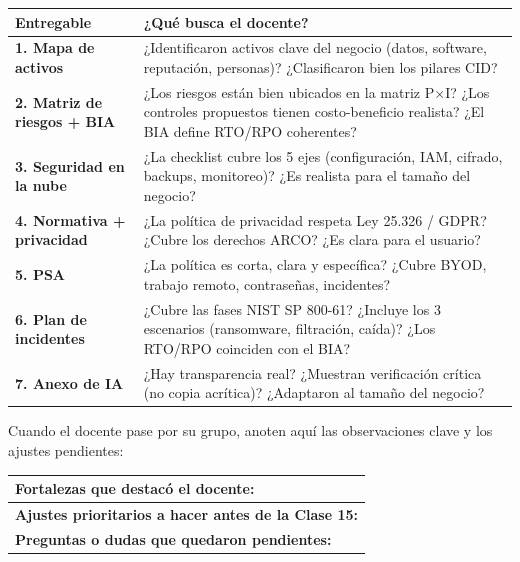 \documentclass[12pt,a4paper]{article}
\renewcommand{\arraystretch}{1.25}
\begin{document}
\vspace{6pt}
\renewcommand{\arraystretch}{1.5}
\begin{tabularx}{\textwidth}{|>{\bfseries\color{azulMentoring}}p{3.2cm}|X|}
\hline
\rowcolor{grisClaro}
\textbf{Entregable} & \textbf{¿Qu\'e busca el docente?} \\
\hline
1. Mapa de activos & ¿Identificaron activos clave del negocio (datos, software, reputaci\'on, personas)? ¿Clasificaron bien los pilares CID? \\
\hline
2. Matriz de riesgos + BIA & ¿Los riesgos est\'an bien ubicados en la matriz P$\times$I? ¿Los controles propuestos tienen costo-beneficio realista? ¿El BIA define RTO/RPO coherentes? \\
\hline
3. Seguridad en la nube & ¿La checklist cubre los 5 ejes (configuraci\'on, IAM, cifrado, backups, monitoreo)? ¿Es realista para el tama\~no del negocio? \\
\hline
4. Normativa + privacidad & ¿La pol\'itica de privacidad respeta Ley 25.326 / GDPR? ¿Cubre los derechos ARCO? ¿Es clara para el usuario? \\
\hline
5. PSA & ¿La pol\'itica es corta, clara y espec\'ifica? ¿Cubre BYOD, trabajo remoto, contrase\~nas, incidentes? \\
\hline
6. Plan de incidentes & ¿Cubre las fases NIST SP 800-61? ¿Incluye los 3 escenarios (ransomware, filtraci\'on, ca\'ida)? ¿Los RTO/RPO coinciden con el BIA? \\
\hline
7. Anexo de IA & ¿Hay transparencia real? ¿Muestran verificaci\'on cr\'itica (no copia acr\'itica)? ¿Adaptaron al tama\~no del negocio? \\
\hline
\end{tabularx}

\vspace{8pt}
\begin{cajaActividad}[title={Registro del feedback docente}]
Cuando el docente pase por su grupo, anoten aqu\'i las observaciones clave y los ajustes pendientes:
\end{cajaActividad}

\vspace{4pt}
\renewcommand{\arraystretch}{1.6}
\begin{tabularx}{\textwidth}{|X|}
\hline
\textbf{Fortalezas que destac\'o el docente:} \\[2.5cm]
\hline
\textbf{Ajustes prioritarios a hacer antes de la Clase 15:} \\[4cm]
\hline
\textbf{Preguntas o dudas que quedaron pendientes:} \\[2cm]
\hline
\end{tabularx}
\end{document}
